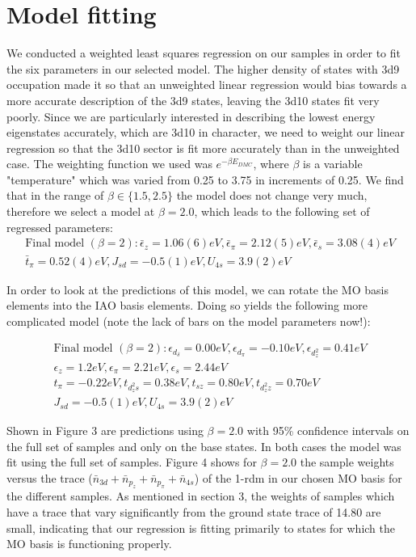 \documentclass{article}
\begin{document}
\section{Model fitting}
We conducted a weighted least squares regression on our samples in order to fit the six parameters in our selected model. The higher density of states with 3d9 occupation made it so that an unweighted linear regression would bias towards a more accurate description of the 3d9 states, leaving the 3d10 states fit very poorly. Since we are particularly interested in describing the lowest energy eigenstates accurately, which are 3d10 in character, we need to weight our linear regression so that the 3d10 sector is fit more accurately than in the unweighted case. The weighting function we used was $e^{-\beta E_{DMC}}$, where $\beta$ is a variable "temperature" which was varied from 0.25 to 3.75 in increments of 0.25. We find that in the range of $\beta \in \{1.5, 2.5\}$ the model does not change very much, therefore we select a model at $\beta = 2.0$, which leads to the following set of regressed parameters:
\begin{multline}
 \boxed{\text{Final model }  (\beta=2): \bar{\epsilon}_z = 1.06(6) eV, \bar{\epsilon}_\pi = 2.12(5) eV, \bar{\epsilon}_s = 3.08(4) eV}\\
\boxed{\bar{t}_\pi = 0.52(4) eV, J_{sd} = -0.5(1) eV, U_{4s} = 3.9(2) eV}
\end{multline}

In order to look at the predictions of this model, we can rotate the MO basis elements into the IAO basis elements. Doing so yields the following more complicated model (note the lack of bars on the model parameters now!):

\begin{multline}
 \boxed{\text{Final model }  (\beta=2): \epsilon_{d_\delta} = 0.00 eV, \epsilon_{d_\pi} = -0.10 eV, \epsilon_{d_z^2} = 0.41 eV }\\
 \boxed{\epsilon_z = 1.2 eV, \epsilon_\pi = 2.21 eV, \epsilon_s = 2.44 eV}\\
\boxed{t_\pi = -0.22 eV, t_{d_z^2 s} = 0.38 eV, t_{s z} = 0.80 eV, t_{d_z^2 z} = 0.70 eV}\\
\boxed{  J_{sd} = -0.5(1) eV, U_{4s} = 3.9(2) eV}
\end{multline}

Shown in Figure 3 are predictions using $\beta = 2.0$ with 95\% confidence intervals on the full set of samples and only on the base states. In both cases the model was fit using the full set of samples. Figure 4 shows for $\beta=2.0$ the sample weights versus the trace ($\bar{n}_{3d} + \bar{n}_{p_z} + \bar{n}_{p_\pi} + \bar{n}_{4s}$) of the 1-rdm in our chosen MO basis for the different samples. As mentioned in section 3, the weights of samples which have a trace that vary significantly from the ground state trace of 14.80 are small, indicating that our regression is fitting primarily to states for which the MO basis is functioning properly.
\end{document}
